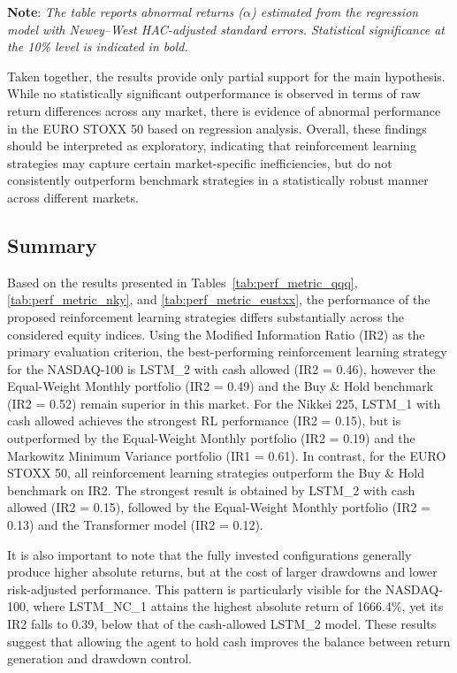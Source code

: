 \documentclass[]{elsarticle}
\begin{document}
\vspace{-0.4cm}
\linespread{0.65}\selectfont
{\noindent\scriptsize \textbf{Note}: \textit{The table reports abnormal returns ($\alpha$) estimated from the regression model with Newey--West HAC-adjusted standard errors. Statistical significance at the 10\% level is indicated in bold.}}

\linespread{1.5}\selectfont

Taken together, the results provide only partial support for the main hypothesis. While no statistically significant outperformance is observed in terms of raw return differences across any market, there is evidence of abnormal performance in the EURO STOXX 50 based on regression analysis. Overall, these findings should be interpreted as exploratory, indicating that reinforcement learning strategies may capture certain market-specific inefficiencies, but do not consistently outperform benchmark strategies in a statistically robust manner across different markets.

\hypertarget{er_Summary}{%
\subsection{Summary}\label{er_Summary}}

Based on the results presented in Tables~\ref{tab:perf_metric_qqq}, 
\ref{tab:perf_metric_nky}, and \ref{tab:perf_metric_eustxx}, the performance of the proposed reinforcement learning strategies differs substantially across the considered equity indices. Using the Modified Information Ratio (IR2) as the primary evaluation criterion, the best-performing reinforcement learning strategy for the NASDAQ-100 is LSTM\_2 with cash allowed (IR2 = 0.46), however the Equal-Weight Monthly portfolio (IR2 = 0.49) and the Buy \& Hold benchmark (IR2 = 0.52) remain superior in this market. For the Nikkei 225, LSTM\_1 with cash allowed achieves the strongest RL performance (IR2 = 0.15), but is outperformed by the Equal-Weight Monthly portfolio (IR2 = 0.19) and the Markowitz Minimum Variance portfolio (IR1 = 0.61). In contrast, for the EURO STOXX 50, all reinforcement learning strategies outperform the Buy \& Hold benchmark on IR2. The strongest result is obtained by LSTM\_2 with cash allowed (IR2 = 0.15), followed by the Equal-Weight Monthly portfolio (IR2 = 0.13) and the Transformer model (IR2 = 0.12).

It is also important to note that the fully invested configurations generally produce higher absolute returns, but at the cost of larger drawdowns and lower risk-adjusted performance. This pattern is particularly visible for the NASDAQ-100, where LSTM\_NC\_1 attains the highest absolute return of 1666.4\%, yet its IR2 falls to 0.39, below that of the cash-allowed LSTM\_2 model. These results suggest that allowing the agent to hold cash improves the balance between return generation and drawdown control.
\end{document}
